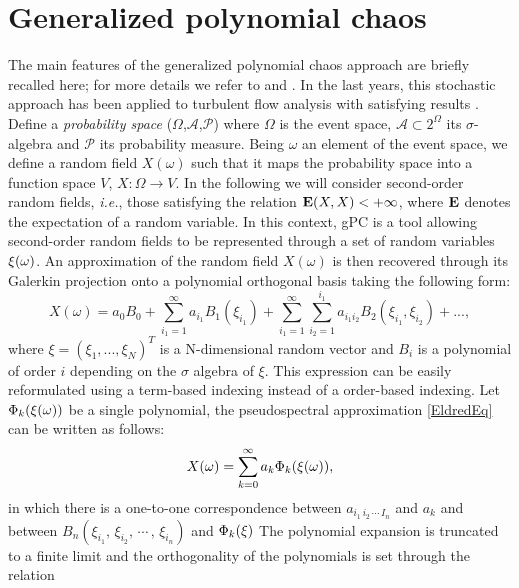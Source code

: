 \documentclass[conf]{new-aiaa}
\begin{document}
\section{Generalized polynomial chaos}
%
The main features of the generalized polynomial chaos approach are briefly recalled here; for more details we refer to \citet{ghanem2003stochastic} and \citet{le2010spectral}.
%
In the last years, this stochastic approach has been applied to turbulent flow analysis with satisfying results \cite{lucor2007sensitivity}. 
%
Define a {\it probability space} ($\Omega$,$\mathcal{A}$,$\mathcal{P}$) where $\Omega$ is the event space, $\mathcal{A} \subset 2^{\Omega}$ its $\sigma$-algebra and $\mathcal{P}$ its probability measure.
%
Being $\omega$ an element of the event space, we define a random field $X(\omega)$ such that it maps the probability space into a function space $V$, $X:\Omega \rightarrow V$.
%
In the following we will consider second-order random fields, \textit{i.e.}, those satisfying the relation ${\bf E}(X,X) < + \infty$, where ${\bf E}$ denotes the expectation of a random variable.
%
In this context, gPC is a tool allowing second-order random fields to be represented through a set of random variables ${\bf \xi}(\omega)$.
%
An approximation of the random field $X(\omega)$ is then recovered through its Galerkin projection onto a polynomial orthogonal basis taking the following form:
%
\begin{equation}
X(\omega)=a_0B_0 + \sum_{i_1=1}^{\infty}a_{i_1}B_1({ \xi_{i_1}})+ \sum_{i_1=1}^{\infty} \sum_{i_2=1}^{i_1}a_{i_1 i_2}B_2({ \xi_{i_1}, \xi_{i_2}}) + ...,
\label{EldredEq}
\end{equation}
%
where $\xi = (\xi_1, ..., \xi_N)^T$ is a N-dimensional random vector and $B_i$ is a polynomial of order $i$ depending on the $\sigma$ algebra of $\xi$.
%
This expression can be easily reformulated using a term-based indexing instead of a order-based indexing.
%
Let $\Phi_k({\bf \xi}(\omega))$ be a single polynomial, the pseudospectral approximation \eqref{EldredEq} can be written as follows:
%
\begin{equation}
X(\omega)=\sum_{k=0}^{\infty}a_k\Phi_k({\bf \xi}(\omega)),
\label{LucorEq}
\end{equation}
%
in which there is a one-to-one correspondence between $a_{i_1 \, i_2 \, \cdots \, I_n}$ and $a_k$ and between $B_n({ \xi_{i_1}, \, \xi_{i_2}, \, \cdots \,, \, \xi_{i_n}})$ and $\Phi_k({\bf \xi})$
The polynomial expansion is truncated to a finite limit and the orthogonality of the polynomials is set through the relation
\end{document}
